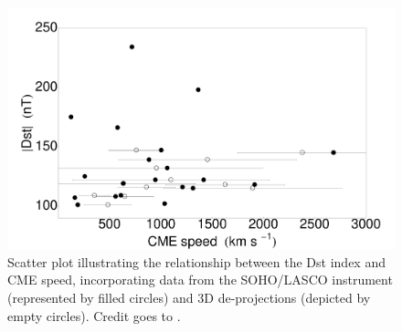 \begin{figure}[!htp]
	\centering
	\includegraphics[width=0.7\hsize]{chapter2/figs/Fig_GS_speed_er_mean.pdf}
	\caption{Scatter plot illustrating the relationship between the Dst index and CME speed, incorporating data from the SOHO/LASCO instrument (represented by filled circles) and 3D de-projections (depicted by empty circles). Credit goes to \citet{miteva_2023}.}
	\label{fig_speeds_dst}
\end{figure}

